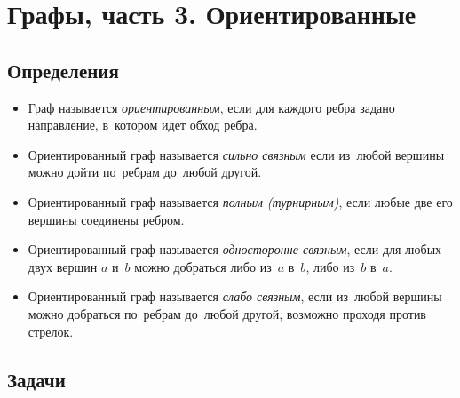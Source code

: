 

\section*{Графы, часть 3. Ориентированные}


\subsection*{Определения}

\begin{itemize}

\item
Граф называется \emph{ориентированным}, если для каждого ребра задано
направление, в~котором идет обход ребра.

\item
Ориентированный граф называется \emph{сильно связным} если из~любой вершины
можно дойти по~ребрам до~любой другой.

\item
Ориентированный граф называется \emph{полным (турнирным)}, если любые две его
вершины соединены ребром.

\item
Ориентированный граф называется \emph{односторонне связным}, если для любых
двух вершин $a$ и~$b$ можно добраться либо из~$a$ в~$b$, либо из~$b$ в~$a$.

\item
Ориентированный граф называется \emph{слабо связным}, если из~любой вершины
можно добраться по~ребрам до~любой другой, возможно проходя против стрелок.

\end{itemize}

\subsection*{Задачи}

